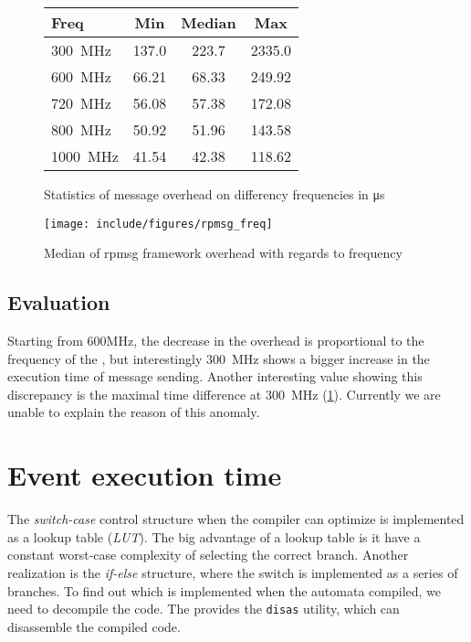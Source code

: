 \begin{figure}
	\centering
	\caption{Statistics of message overhead on differency \cpu{} frequencies in \unit{\micro\second}}
	\begin{tabular}{l c c c}
		\toprule
		Freq & Min & Median & Max \\
		\midrule
		\qty{300}{\MHz}  & 137.0 & 223.7 & 2335.0 \\
		\qty{600}{\MHz}  & 66.21 & 68.33 & 249.92 \\
		\qty{720}{\MHz}  & 56.08 & 57.38 & 172.08 \\
		\qty{800}{\MHz}  & 50.92 & 51.96 & 143.58 \\
		\qty{1000}{\MHz} & 41.54 & 42.38 & 118.62 \\
		\bottomrule
	\end{tabular}
\label{fig:rpmsg_freq_stats}
\end{figure}

\begin{figure}[h]
	\centering
	\texttt{[image: include/figures/rpmsg\_freq]}
	\caption{Median of rpmsg framework overhead with regards to \cpu{} frequency}
\label{fig:rpmsg_overhead_plot}
\end{figure}

\subsection{Evaluation}

Starting from 600MHz, the decrease in the overhead is proportional to the frequency of the \cpu{}, but interestingly \qty{300}{\MHz} shows a bigger increase in the execution time of message sending. Another interesting value showing this discrepancy is the maximal time difference at \qty{300}{\MHz} (\cref{fig:rpmsg_freq_stats}). Currently we are unable to explain the reason of this anomaly.

\section{Event execution time}

The \emph{switch-case} control structure when the compiler can optimize is implemented as a lookup table (\emph{LUT}). The big advantage of a lookup table is it have a constant worst-case complexity of selecting the correct branch. Another realization is the \emph{if-else} structure, where the switch is implemented as a series of branches. To find out which is implemented when the automata compiled, we need to decompile the code. The \pru{}  provides the \texttt{disas} utility, which can disassemble the compiled code.

